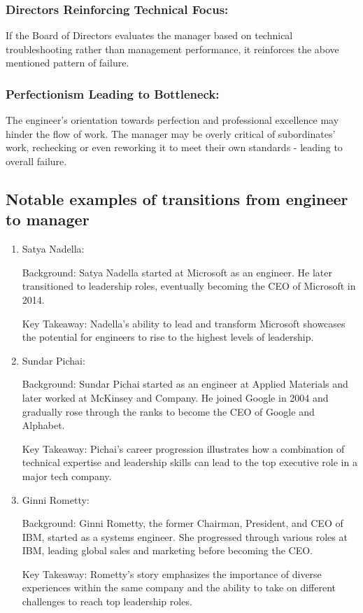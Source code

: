 \documentclass[runningheads]{article}
\begin{document}
\subsubsection{Directors Reinforcing Technical Focus: \\}
If the Board of Directors evaluates the manager based on technical troubleshooting rather than management performance, it reinforces the above mentioned pattern of failure.

\subsubsection{Perfectionism Leading to Bottleneck: \\}
The engineer's orientation towards perfection and professional excellence may hinder the flow of work. The manager may be overly critical of subordinates' work, rechecking or even reworking it to meet their own standards - leading to overall failure.

\subsection{Notable examples of transitions from engineer to manager}

\begin{enumerate}
    \item Satya Nadella:

    Background: Satya Nadella started at Microsoft as an engineer. He later transitioned to leadership roles, eventually becoming the CEO of Microsoft in 2014.

    Key Takeaway: Nadella's ability to lead and transform Microsoft showcases the potential for engineers to rise to the highest levels of leadership.

    \item Sundar Pichai:
    
    Background: Sundar Pichai started as an engineer at Applied Materials and later worked at McKinsey and Company. He joined Google in 2004 and gradually rose through the ranks to become the CEO of Google and Alphabet.
    
    Key Takeaway: Pichai's career progression illustrates how a combination of technical expertise and leadership skills can lead to the top executive role in a major tech company.

    \item Ginni Rometty:

    Background: Ginni Rometty, the former Chairman, President, and CEO of IBM, started as a systems engineer. She progressed through various roles at IBM, leading global sales and marketing before becoming the CEO.
    
    Key Takeaway: Rometty's story emphasizes the importance of diverse experiences within the same company and the ability to take on different challenges to reach top leadership roles.

\end{enumerate}
\end{document}
